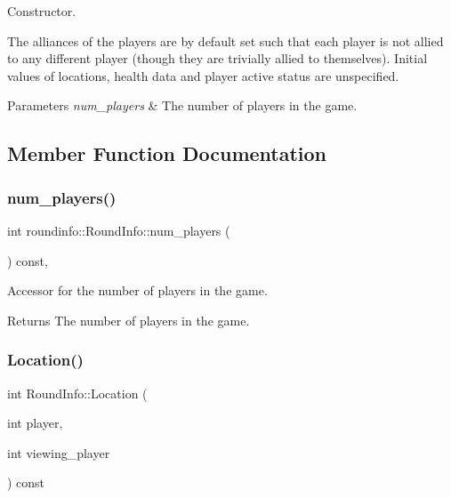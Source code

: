 Constructor. 

The alliances of the players are by default set such that each player is not allied to any different player (though they are trivially allied to themselves). Initial values of locations, health data and player active status are unspecified. 
\begin{DoxyParams}{Parameters}
{\em num\+\_\+players} & The number of players in the game. \\
\hline
\end{DoxyParams}


\subsection{Member Function Documentation}
\mbox{\label{classroundinfo_1_1_round_info_a004757e903e2b24d73d746040f8afd42}} 
\subsubsection{\texorpdfstring{num\+\_\+players()}{num\_players()}}
{\footnotesize\ttfamily int roundinfo\+::\+Round\+Info\+::num\+\_\+players (\begin{DoxyParamCaption}{ }\end{DoxyParamCaption}) const\hspace{0.3cm}{\ttfamily [inline]}, {\ttfamily [noexcept]}}



Accessor for the number of players in the game. 

\begin{DoxyReturn}{Returns}
The number of players in the game. 
\end{DoxyReturn}
\mbox{\label{classroundinfo_1_1_round_info_aab20da577e7b2741d4e478b6d353324c}} 
\subsubsection{\texorpdfstring{Location()}{Location()}}
{\footnotesize\ttfamily int Round\+Info\+::\+Location (\begin{DoxyParamCaption}\item[{int}]{player,  }\item[{int}]{viewing\+\_\+player }\end{DoxyParamCaption}) const}



